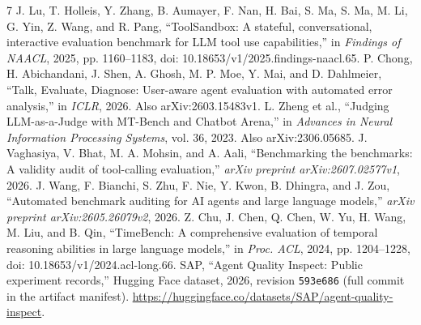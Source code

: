 \begin{thebibliography}{7}
J. Lu, T. Holleis, Y. Zhang, B. Aumayer, F. Nan, H. Bai, S. Ma, S. Ma, M. Li, G. Yin, Z. Wang, and R. Pang,
``ToolSandbox: A stateful, conversational, interactive evaluation benchmark for LLM tool use capabilities,''
in \emph{Findings of NAACL}, 2025, pp. 1160--1183, doi: 10.18653/v1/2025.findings-naacl.65.
P. Chong, H. Abichandani, J. Shen, A. Ghosh, M. P. Moe, Y. Mai, and D. Dahlmeier,
``Talk, Evaluate, Diagnose: User-aware agent evaluation with automated error analysis,''
in \emph{ICLR}, 2026. Also arXiv:2603.15483v1.
L. Zheng et al., ``Judging LLM-as-a-Judge with MT-Bench and Chatbot Arena,''
in \emph{Advances in Neural Information Processing Systems}, vol. 36, 2023. Also arXiv:2306.05685.
J. Vaghasiya, V. Bhat, M. A. Mohsin, and A. Aali,
``Benchmarking the benchmarks: A validity audit of tool-calling evaluation,''
\emph{arXiv preprint arXiv:2607.02577v1}, 2026.
J. Wang, F. Bianchi, S. Zhu, F. Nie, Y. Kwon, B. Dhingra, and J. Zou,
``Automated benchmark auditing for AI agents and large language models,''
\emph{arXiv preprint arXiv:2605.26079v2}, 2026.
Z. Chu, J. Chen, Q. Chen, W. Yu, H. Wang, M. Liu, and B. Qin,
``TimeBench: A comprehensive evaluation of temporal reasoning abilities in large language models,''
in \emph{Proc. ACL}, 2024, pp. 1204--1228, doi: 10.18653/v1/2024.acl-long.66.
SAP, ``Agent Quality Inspect: Public experiment records,'' Hugging Face dataset, 2026,
revision \texttt{593e686} (full commit in the artifact manifest).
\url{https://huggingface.co/datasets/SAP/agent-quality-inspect}.
\end{thebibliography}
